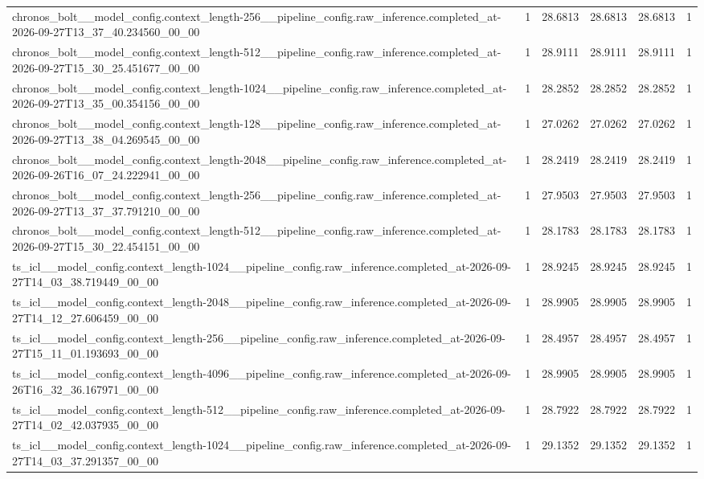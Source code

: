 \begin{tabular}{llllll}
chronos\_bolt\_\_model\_config.context\_length-256\_\_pipeline\_config.raw\_inference.completed\_at-2026-09-27T13\_37\_40.234560\_00\_00 & 1 & 28.6813 & 28.6813 & 28.6813 & 1 \\
chronos\_bolt\_\_model\_config.context\_length-512\_\_pipeline\_config.raw\_inference.completed\_at-2026-09-27T15\_30\_25.451677\_00\_00 & 1 & 28.9111 & 28.9111 & 28.9111 & 1 \\
chronos\_bolt\_\_model\_config.context\_length-1024\_\_pipeline\_config.raw\_inference.completed\_at-2026-09-27T13\_35\_00.354156\_00\_00 & 1 & 28.2852 & 28.2852 & 28.2852 & 1 \\
chronos\_bolt\_\_model\_config.context\_length-128\_\_pipeline\_config.raw\_inference.completed\_at-2026-09-27T13\_38\_04.269545\_00\_00 & 1 & 27.0262 & 27.0262 & 27.0262 & 1 \\
chronos\_bolt\_\_model\_config.context\_length-2048\_\_pipeline\_config.raw\_inference.completed\_at-2026-09-26T16\_07\_24.222941\_00\_00 & 1 & 28.2419 & 28.2419 & 28.2419 & 1 \\
chronos\_bolt\_\_model\_config.context\_length-256\_\_pipeline\_config.raw\_inference.completed\_at-2026-09-27T13\_37\_37.791210\_00\_00 & 1 & 27.9503 & 27.9503 & 27.9503 & 1 \\
chronos\_bolt\_\_model\_config.context\_length-512\_\_pipeline\_config.raw\_inference.completed\_at-2026-09-27T15\_30\_22.454151\_00\_00 & 1 & 28.1783 & 28.1783 & 28.1783 & 1 \\
ts\_icl\_\_model\_config.context\_length-1024\_\_pipeline\_config.raw\_inference.completed\_at-2026-09-27T14\_03\_38.719449\_00\_00 & 1 & 28.9245 & 28.9245 & 28.9245 & 1 \\
ts\_icl\_\_model\_config.context\_length-2048\_\_pipeline\_config.raw\_inference.completed\_at-2026-09-27T14\_12\_27.606459\_00\_00 & 1 & 28.9905 & 28.9905 & 28.9905 & 1 \\
ts\_icl\_\_model\_config.context\_length-256\_\_pipeline\_config.raw\_inference.completed\_at-2026-09-27T15\_11\_01.193693\_00\_00 & 1 & 28.4957 & 28.4957 & 28.4957 & 1 \\
ts\_icl\_\_model\_config.context\_length-4096\_\_pipeline\_config.raw\_inference.completed\_at-2026-09-26T16\_32\_36.167971\_00\_00 & 1 & 28.9905 & 28.9905 & 28.9905 & 1 \\
ts\_icl\_\_model\_config.context\_length-512\_\_pipeline\_config.raw\_inference.completed\_at-2026-09-27T14\_02\_42.037935\_00\_00 & 1 & 28.7922 & 28.7922 & 28.7922 & 1 \\
ts\_icl\_\_model\_config.context\_length-1024\_\_pipeline\_config.raw\_inference.completed\_at-2026-09-27T14\_03\_37.291357\_00\_00 & 1 & 29.1352 & 29.1352 & 29.1352 & 1 \\

\end{tabular}
